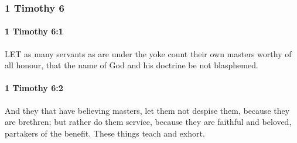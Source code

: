 	\subsubsection{1 Timothy 6} %
		\label{1TIMOTHY-6}
		
		\paragraph{1 Timothy 6:1} %
			\label{1TIMOTHY-6-1}

			LET as many servants as are under the yoke count their own masters worthy of all honour, that the name of God and his doctrine be not blasphemed.

			\begin{framed}
			\scriptsize
				\begin{compactdesc}
					\item[SBLG] 
				\end{compactdesc}
			\end{framed}

		\paragraph{1 Timothy 6:2} %
			\label{1TIMOTHY-6-2}

			And they that have believing masters, let them not despise them, because they are brethren; but rather do them service, because they are faithful and beloved, partakers of the benefit.  These things teach and exhort.


